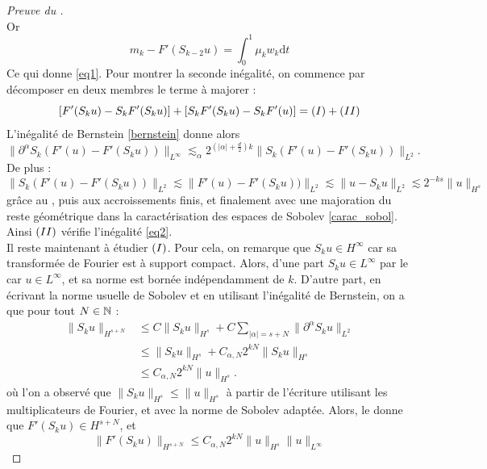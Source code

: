 \documentclass[11pt,a4paper]{article}
\begin{document}
\begin{proof}[Preuve du ]
\begin{equation*}
\end{equation*}
Or 
\begin{equation*}
m_k - F'(S_{k-2}u) = \int_0^1 \mu_k w_k\mathrm{d}t
\end{equation*}
Ce qui donne \eqref{eq1}.
Pour montrer la seconde inégalité, on commence par décomposer en deux membres le terme à majorer :
\begin{equation*}
\left[ F'(S_{k}u) - S_k F'(S_{k}u) \right] + \left[ S_k F'(S_{k}u) - S_kF'(u) \right] = (\rom{1}) + (\rom{2})
\end{equation*}
L'inégalité de Bernstein \eqref{bernstein} donne alors 
\begin{equation*}
\|\partial^\alpha S_k (F'(u) - F'(S_ku) )\|_{L^\infty} \lesssim_\alpha 2^{(|\alpha| + \frac{d}{2})k } \|S_k (F'(u) - F'(S_ku) )\|_{L^2}.
\end{equation*}
De plus :
\begin{equation*}
\|S_k (F'(u) - F'(S_ku) )\|_{L^2} \lesssim \|F'(u) - F'(S_ku) )\|_{L^2} \lesssim \|u-S_ku\|_{L^2} \lesssim 2^{-ks}\|u\|_{H^s}
\end{equation*}
grâce au , puis aux accroissements finis, et finalement avec une majoration du reste géométrique dans la caractérisation des espaces de Sobolev \eqref{carac_sobol}. Ainsi $(\rom{2})$ vérifie l'inégalité \eqref{eq2}. \\
Il reste maintenant à étudier $(\rom{1})$. Pour cela, on remarque que $S_ku \in H^\infty$ car sa transformée de Fourier est à support compact. Alors, d'une part $S_ku \in L^\infty	$ par le  car $u\in L^\infty$, et sa norme est bornée indépendamment de $k$. D'autre part, en écrivant la norme usuelle de Sobolev et en utilisant l'inégalité de Bernstein, on a que pour tout $N \in \mathbb N$ :
\begin{align*}
 \|S_ku\|_{H^{s+N}} &\leq C\|S_ku\|_{H^s} + C\sum_{|\alpha|=s+N} \|\partial^\alpha S_k u \|_{L^2} \\
& \leq \|S_ku\|_{H^s} + C_{\alpha,N} 2^{kN} \|S_ku\|_{H^s} \\
& \leq C_{\alpha,N} 2^{kN}\|u\|_{H^s} .
\end{align*}
où l'on a observé que $\|S_ku\|_{H^s} \leq \|u\|_{H^s}$ à partir de l'écriture utilisant les multiplicateurs de Fourier, et avec la norme de Sobolev adaptée. Alors, le  donne que $F'(S_ku)\in H^{s+N}$, et 
\begin{equation}\label{utillem}
\|F'(S_ku)\|_{H^{s+N}} \leq C_{\alpha,N}2^{kN}\|u\|_{H^s}\|u\|_{L^\infty}
\end{equation}

\end{proof}
\end{document}
